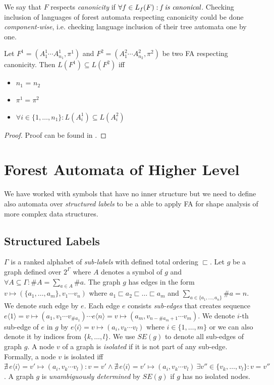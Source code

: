 We say that $F$ respects \emph{canonicity} if $\forall f \in L_f(F): \emph{f is canonical}$.
Checking inclusion of languages of forest automata respecting canonicity could be done \emph{component-wise},
i.e. checking language inclusion of their tree automata one by one.

\begin{lemma}
	Let $F^1 = (A_1^1\cdots A_{n_{1}}^1, \pi^1)$ and $F^2 = (A_1^2\cdots A_{n_{2}}^2, \pi^2)$
	be two FA respecting canonicity.
	Then $L(F^1) \subseteq L(F^2)$ iff
	\begin{itemize}
			\item $n_1$ = $n_2$
			\item $\pi^1 = \pi^2$
			\item $\forall i \in \{1,\ldots,n_1\}: L(A_i^1) \subseteq L(A_i^2)$
	\end{itemize}
\end{lemma}
\begin{proof}
	Proof can be found in \cite{forester:techrep}.
\end{proof}

\section{Forest Automata of Higher Level}
\label{sec:fah}

We have worked with symbols that have no inner structure but
we need to define also automata over \emph{structured labels} to be a
able to apply FA for shape analysis of more complex data structures.

\subsection{Structured Labels}

$\Gamma$ is a ranked alphabet of \emph{sub-labels} with defined total ordering $\sqsubset$.
Let $g$ be a graph defined over $2^\Gamma$ where $A$ denotes a symbol of $g$ and $\forall A \subseteq \Gamma: \#A = \sum_{a\in A} \#a$.
The graph $g$ has edges in the form $v \mapsto (\{a_1,\ldots,a_m\},v_1 \cdots v_n)$ where
$a_1 \sqsubset a_2 \sqsubset \ldots \sqsubset a_m$ and $\sum_{a \in \{a_1,\ldots,a_n\}} \# a = n$.
We denote such edge by $e$.
Each edge $e$ consists \emph{sub-edges} that creates sequence $e\langle 1\rangle = v \mapsto (a_1,v_1 \cdots v_{\#a_1}) \cdots e\langle n\rangle= v \mapsto (a_m,v_{n-\#a_m+1} \cdots v_m)$.
We denote $i$-th sub-edge of $e$ in $g$ by $e\langle i\rangle = v \mapsto (a_i,v_k \cdots v_l)$ where $i \in \{1,\ldots,m\}$ or
we can also denote it by indices from $\{k,\ldots,l\}$.
We use $SE(g)$ to denote all sub-edges of graph $g$.
A node $v$ of a graph is \emph{isolated} if it is not part of any sub-edge.
Formally, a node $v$ is isolated iff $\nexists\, e\langle i\rangle = v' \mapsto (a_i,v_k \cdots v_l): v = v' \wedge \nexists\, e\langle i\rangle = v' \mapsto (a_i,v_k \cdots v_l)\ \exists v'' \in \{v_k,\ldots, v_l\}: v = v''$.
A graph $g$ is \emph{unambiguously determined} by $SE(g)$ if $g$ has no isolated nodes.

